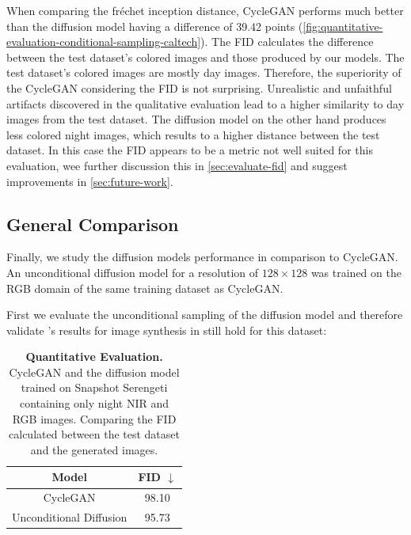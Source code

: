 When comparing the fréchet inception distance, CycleGAN performs much better than the diffusion model having a difference of 39.42 points (\autoref{fig:quantitative-evaluation-conditional-sampling-caltech}).
The FID calculates the difference between the test dataset's colored images and those produced by our models.
The test dataset's colored images are mostly day images.
Therefore, the superiority of the CycleGAN considering the FID is not surprising.
Unrealistic and unfaithful artifacts discovered in the qualitative evaluation lead to a higher similarity to day images from the test dataset.
The diffusion model on the other hand produces less colored night images, which results to a higher distance between the test dataset.
In this case the FID appears to be a metric not well suited for this evaluation, wee further discussion this in \autoref{sec:evaluate-fid} and suggest improvements in \autoref{sec:future-work}.

\subsection{General Comparison}
\label{sec:diffusion-vs-cyclegan-night}
Finally, we study the diffusion models performance in comparison to CycleGAN.
An unconditional diffusion model for a resolution of $128 \times 128$ was trained on the RGB domain of the same training dataset as CycleGAN.

First we evaluate the unconditional sampling of the diffusion model and therefore validate \parencite{diffusion-beats-gans}'s results for image synthesis in still hold for this dataset:

\begin{table}[htp!]
    \centering
    \begin{tabular}{c | c}
        Model                   & FID  $\downarrow$ \\
        \hline\hline
        CycleGAN                & 98.10             \\
        Unconditional Diffusion & 95.73
    \end{tabular}
    \caption{
        \textbf{Quantitative Evaluation.} CycleGAN and the diffusion model trained on Snapshot Serengeti \parencite{serengeti} containing only night NIR and RGB images.
        Comparing the FID calculated between the test dataset and the generated images.
    }
    \label{fig:quantitative-evaluation-unconditional-sampling}
\end{table}

